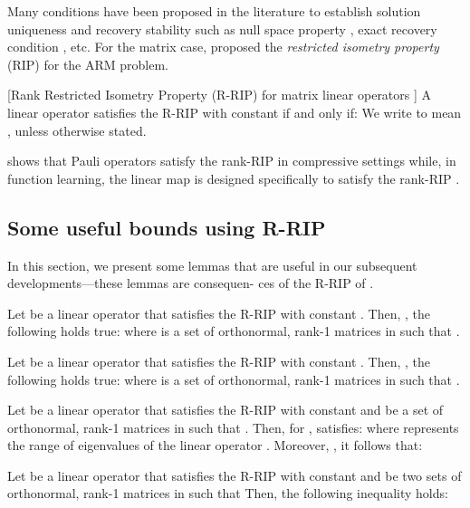 \documentclass[twocolumn]{svjour3}
\begin{document}
Many conditions have been proposed in the literature to establish solution uniqueness and recovery stability such as null space property \cite{cohen06}, exact recovery condition \cite{Tro04:Greed-Good}, etc.
For the matrix case, \cite{brecht2010} proposed the {\it restricted isometry property} (RIP) for the ARM problem. 

\begin{definition}{\label{def:RIP}}[Rank Restricted Isometry Property (R-RIP) for matrix linear operators \cite{brecht2010}] A linear operator   satisfies the R-RIP with constant  if and only if:
  We write  to mean , unless otherwise stated.
\end{definition} \cite{liuuniversal} shows that Pauli operators satisfy the rank-RIP in compressive settings while, in function learning, the linear map  is designed specifically to satisfy the rank-RIP \cite{hemant2012active}.

\subsection{Some useful bounds using R-RIP}

In this section, we present some lemmas that are useful in our subsequent developments---these lemmas are consequen- ces of the R-RIP of .

\begin{lemma}{\label{lemma:1}}\cite{admira2010}
Let  be a linear operator that satisfies the R-RIP with constant . Then, , the following holds true:
 where  is a set of orthonormal, rank-1 matrices in  such that .
\end{lemma}

\begin{lemma}{\label{lemma:2}}\cite{admira2010}
Let  be a linear operator that satisfies the R-RIP with constant . Then, , the following holds true:
 where  is a set of orthonormal, rank-1 matrices in  such that .
\end{lemma}

\begin{lemma}{\label{lemma:3}}\cite{Goldfarb:2011}
Let  be a linear operator that satisfies the R-RIP with constant  and  be a set of orthonormal, rank-1 matrices in  such that . Then, for ,  satisfies:
 where  represents the range of eigenvalues of the linear operator .
Moreover, , it follows that:

\end{lemma}

\begin{lemma}{\label{lemma:4}}\cite{Goldfarb:2011}
Let  be a linear operator that satisfies the R-RIP with constant  and  be two sets of orthonormal, rank-1 matrices in  such that 
 Then, the following inequality holds:

\end{lemma}
\end{document}
